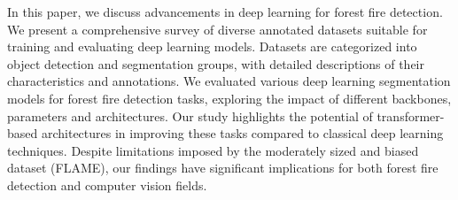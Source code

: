 In this paper, we discuss advancements in deep learning for forest fire detection. We present a comprehensive survey of diverse annotated datasets suitable for training and evaluating deep learning models. Datasets are categorized into object detection and segmentation groups, with detailed descriptions of their characteristics and annotations. We evaluated various deep learning segmentation models for forest fire detection tasks, exploring the impact of different backbones, parameters and architectures. Our study highlights the potential of transformer-based architectures in improving these tasks compared to classical deep learning techniques. Despite limitations imposed by the moderately sized and biased dataset (FLAME), our findings have significant implications for both forest fire detection and computer vision fields.